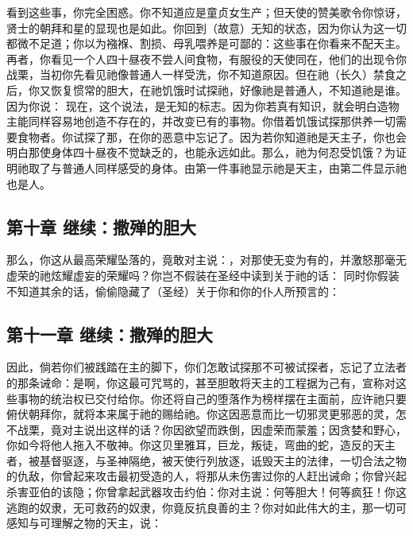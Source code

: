 看到这些事，你完全困惑。你不知道应是童贞女生产；但天使的赞美歌令你惊讶，贤士的朝拜和星的显现也是如此。你回到（故意）无知的状态，因为你认为这一切都微不足道；你以为襁褓、割损、母乳喂养是可鄙的：这些事在你看来不配天主。再者，你看见一个人四十昼夜不尝人间食物，有服役的天使同在，他们的出现令你战栗，当初你先看见祂像普通人一样受洗，你不知道原因。但在祂（长久）禁食之后，你又恢复惯常的胆大，在祂饥饿时试探祂，好像祂是普通人，不知道祂是谁。因为你说： 现在，这个说法，是无知的标志。因为你若真有知识，就会明白造物主能同样容易地创造不存在的，并改变已有的事物。你借着饥饿试探那供养一切需要食物者。你试探了那，在你的恶意中忘记了。因为若你知道祂是天主子，你也会明白那使身体四十昼夜不觉缺乏的，也能永远如此。那么，祂为何忍受饥饿？为证明祂取了与普通人同样感受的身体。由第一件事祂显示祂是天主，由第二件显示祂也是人。\par


\subsection{第十章 继续：撒殚的胆大}

那么，你这从最高荣耀坠落的，竟敢对主说：，对那使无变为有的，并激怒那毫无虚荣的祂炫耀虚妄的荣耀吗？你岂不假装在圣经中读到关于祂的话： 同时你假装不知道其余的话，偷偷隐藏了（圣经）关于你和你的仆人所预言的：\par


\subsection{第十一章 继续：撒殚的胆大}

因此，倘若你们被践踏在主的脚下，你们怎敢试探那不可被试探者，忘记了立法者的那条诫命：是啊，你这最可咒骂的，甚至胆敢将天主的工程据为己有，宣称对这些事物的统治权已交付给你。你还将自己的堕落作为榜样摆在主面前，应许祂只要俯伏朝拜你，就将本来属于祂的赐给祂。你这因恶意而比一切邪灵更邪恶的灵，怎不战栗，竟对主说出这样的话？你因欲望而跌倒，因虚荣而蒙羞；因贪婪和野心，你如今将他人拖入不敬神。你这贝里雅耳，巨龙，叛徒，弯曲的蛇，造反的天主者，被基督驱逐，与圣神隔绝，被天使行列放逐，诋毁天主的法律，一切合法之物的仇敌，你曾起来攻击最初受造的人，将那从未伤害过你的人赶出诫命；你曾兴起杀害亚伯的该隐；你曾拿起武器攻击约伯：你对主说：何等胆大！何等疯狂！你这逃跑的奴隶，无可救药的奴隶，你竟反抗良善的主？你对如此伟大的主，那一切可感知与可理解之物的天主，说：\par

